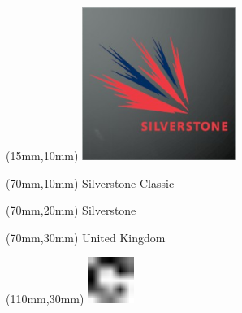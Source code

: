 \null\newpage
\begin{textblock*}{50mm}(15mm,10mm)%
\includegraphics[width=50mm]{LG/2015-05-20_00094.png}
\end{textblock*}
\begin{textblock*}{130mm}(70mm,10mm)%
{\fontsize{20}{20}\selectfont Silverstone Classic}\\
\end{textblock*}
\begin{textblock*}{120mm}(70mm,20mm)%
{\fontsize{16}{16}\selectfont Silverstone}\\
\end{textblock*}
\begin{textblock*}{120mm}(70mm,30mm)%
{\fontsize{12}{12}\selectfont United Kingdom}
\end{textblock*}
\begin{textblock*}{30mm}(110mm,30mm)%
\centering
\includegraphics[height=15mm]{icons/fa-rotate-right.pdf}
\end{textblock*}
